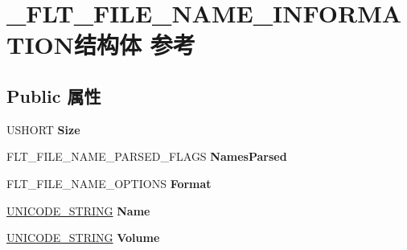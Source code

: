 \hypertarget{struct___f_l_t___f_i_l_e___n_a_m_e___i_n_f_o_r_m_a_t_i_o_n}{}\section{\+\_\+\+F\+L\+T\+\_\+\+F\+I\+L\+E\+\_\+\+N\+A\+M\+E\+\_\+\+I\+N\+F\+O\+R\+M\+A\+T\+I\+O\+N结构体 参考}
\label{struct___f_l_t___f_i_l_e___n_a_m_e___i_n_f_o_r_m_a_t_i_o_n}
\subsection*{Public 属性}
\begin{DoxyCompactItemize}
\item 
\mbox{\label{struct___f_l_t___f_i_l_e___n_a_m_e___i_n_f_o_r_m_a_t_i_o_n_a2807060331eb138c401676554340b9a3}} 
U\+S\+H\+O\+RT {\bfseries Size}
\item 
\mbox{\label{struct___f_l_t___f_i_l_e___n_a_m_e___i_n_f_o_r_m_a_t_i_o_n_a3061a546bfb4bac2d550c66be70dfe6a}} 
F\+L\+T\+\_\+\+F\+I\+L\+E\+\_\+\+N\+A\+M\+E\+\_\+\+P\+A\+R\+S\+E\+D\+\_\+\+F\+L\+A\+GS {\bfseries Names\+Parsed}
\item 
\mbox{\label{struct___f_l_t___f_i_l_e___n_a_m_e___i_n_f_o_r_m_a_t_i_o_n_a131c9834e412ef5bccef7ac5e04658c4}} 
F\+L\+T\+\_\+\+F\+I\+L\+E\+\_\+\+N\+A\+M\+E\+\_\+\+O\+P\+T\+I\+O\+NS {\bfseries Format}
\item 
\mbox{\label{struct___f_l_t___f_i_l_e___n_a_m_e___i_n_f_o_r_m_a_t_i_o_n_a1674351e5f83c90af37674e3ca5dc3fa}} 
\hyperlink{struct___u_n_i_c_o_d_e___s_t_r_i_n_g}{U\+N\+I\+C\+O\+D\+E\+\_\+\+S\+T\+R\+I\+NG} {\bfseries Name}
\item 
\mbox{\label{struct___f_l_t___f_i_l_e___n_a_m_e___i_n_f_o_r_m_a_t_i_o_n_a47e13b7ddd93569de2a6539295991903}} 
\hyperlink{struct___u_n_i_c_o_d_e___s_t_r_i_n_g}{U\+N\+I\+C\+O\+D\+E\+\_\+\+S\+T\+R\+I\+NG} {\bfseries Volume}

\end{DoxyCompactItemize}
